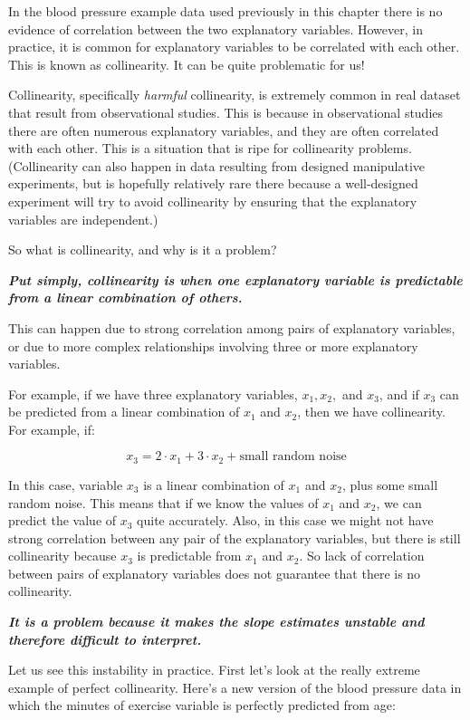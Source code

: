 \documentclass[
  letterpaper,
  8pt,
  a4paper]{book}
\begin{document}

In the blood pressure example data used previously in this chapter there
is no evidence of correlation between the two explanatory variables.
However, in practice, it is common for explanatory variables to be
correlated with each other. This is known as collinearity. It can be
quite problematic for us!

Collinearity, specifically \emph{harmful} collinearity, is extremely
common in real dataset that result from observational studies. This is
because in observational studies there are often numerous explanatory
variables, and they are often correlated with each other. This is a
situation that is ripe for collinearity problems. (Collinearity can also
happen in data resulting from designed manipulative experiments, but is
hopefully relatively rare there because a well-designed experiment will
try to avoid collinearity by ensuring that the explanatory variables are
independent.)

So what is collinearity, and why is it a problem?

\textbf{\emph{Put simply, collinearity is when one explanatory variable
is predictable from a linear combination of others.}}

This can happen due to strong correlation among pairs of explanatory
variables, or due to more complex relationships involving three or more
explanatory variables.

For example, if we have three explanatory variables, \(x_1, x_2,\) and
\(x_3\), and if \(x_3\) can be predicted from a linear combination of
\(x_1\) and \(x_2\), then we have collinearity. For example, if:

\[x_3 = 2 \cdot x_1 + 3 \cdot x_2 + \text{small random noise}\]

In this case, variable \(x_3\) is a linear combination of \(x_1\) and
\(x_2\), plus some small random noise. This means that if we know the
values of \(x_1\) and \(x_2\), we can predict the value of \(x_3\) quite
accurately. Also, in this case we might not have strong correlation
between any pair of the explanatory variables, but there is still
collinearity because \(x_3\) is predictable from \(x_1\) and \(x_2\). So
lack of correlation between pairs of explanatory variables does not
guarantee that there is no collinearity.

\textbf{\emph{It is a problem because it makes the slope estimates
unstable and therefore difficult to interpret.}}

Let us see this instability in practice. First let's look at the really
extreme example of perfect collinearity. Here's a new version of the
blood pressure data in which the minutes of exercise variable is
perfectly predicted from age:
\end{document}
